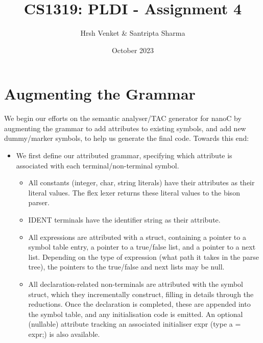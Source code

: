 \documentclass{article}
\title{CS1319: PLDI - Assignment 4}
\author{Hrsh Venket \& Santripta Sharma}
\date{October 2023}
\begin{document}
\maketitle 

\section{Augmenting the Grammar}
We begin our efforts on the semantic analyser/TAC generator for nanoC by augmenting the grammar to add attributes to existing symbols, and add new dummy/marker symbols, to help us generate the final code. Towards this end:

\begin{itemize}
	\item We first define our attributed grammar, specifying which attribute is associated with each terminal/non-terminal symbol. \begin{itemize}
		\item All constants (integer, char, string literals) have their attributes as their literal values. The flex lexer returns these literal values to the bison parser.
		\item IDENT terminals have the identifier string as their attribute.
		\item All expressions are attributed with a struct, containing a pointer to a symbol table entry, a pointer to a true/false list, and a pointer to a next list. Depending on the type of expression (what path it takes in the parse tree), the pointers to the true/false and next lists may be null.
		\item All declaration-related non-terminals are attributed with the symbol struct, which they incrementally construct, filling in details through the reductions. Once the declaration is completed, these are appended into the symbol table, and any initialisation code is emitted. An optional (nullable) attribute tracking an associated initialiser expr (type a = expr;) is also available.
	\end{itemize}
\end{itemize}
\end{document}
